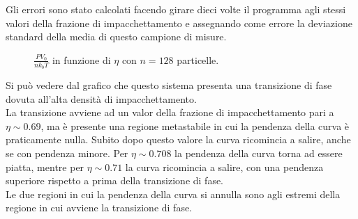 Gli errori sono stato calcolati facendo girare dieci volte il programma agli stessi valori della frazione di impacchettamento e assegnando come errore la deviazione standard della media di questo campione di misure.

\begin{figure}[ht]
	\centering
	\caption{ $\frac{P V_0}{n k_{b} T}$ in funzione di $\eta$ con $n=128$ particelle.}
	\end{figure}
Si può vedere dal grafico che questo sistema presenta una transizione di fase dovuta all'alta densità di impacchettamento.\\
La transizione avviene ad un valor della frazione di impacchettamento pari a $\eta \sim 0.69$, ma è presente una regione metastabile in cui la pendenza della curva è praticamente nulla.
Subito dopo questo valore la curva ricomincia a salire, anche se con pendenza minore.
Per $\eta \sim 0.708$ la pendenza della curva torna ad essere piatta, mentre per $\eta \sim 0.71$ la curva ricomincia a salire, con una pendenza superiore rispetto a prima della transizione di fase.\\
Le due regioni in cui la pendenza della curva si annulla sono agli estremi della regione in cui avviene la transizione di fase. 


